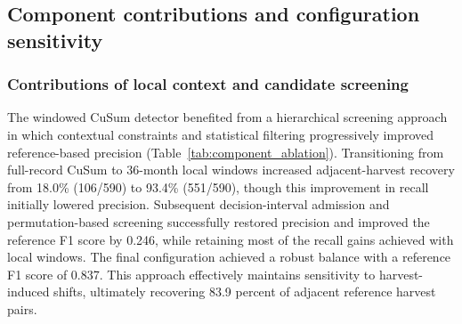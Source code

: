 \subsection{Component contributions and configuration sensitivity}
\label{sec:cusum_components_sensitivity}

\subsubsection{Contributions of local context and candidate screening}
\label{sec:representation_component_ablation}

The windowed CuSum detector benefited from a hierarchical screening approach in which contextual constraints and statistical filtering progressively improved reference-based precision (Table~\ref{tab:component_ablation}). Transitioning from full-record CuSum to 36-month local windows increased adjacent-harvest recovery from 18.0\% (106/590) to 93.4\% (551/590), though this improvement in recall initially lowered precision. Subsequent decision-interval admission and permutation-based screening successfully restored precision and improved the reference F1 score by 0.246, while retaining most of the recall gains achieved
with local windows. The final configuration achieved a robust balance with a reference F1 score of 0.837. This approach effectively maintains sensitivity to harvest-induced shifts, ultimately recovering 83.9 percent of adjacent reference harvest pairs.

